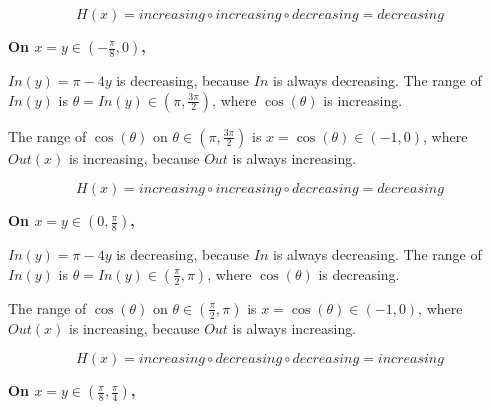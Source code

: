 \documentclass{ximera}
\begin{document}
\[
H(x) = increasing \circ increasing \circ decreasing = decreasing
\]











\textbf{\textcolor{purple!80!black}{On $x = y \in \left( -\frac{\pi}{8}, 0 \right)$, }}



$In(y) = \pi - 4y$ is decreasing, because $In$ is always decreasing.  The range of $In(y)$ is $\theta = In(y) \in \left(\pi, \frac{3\pi}{2} \right)$, where $\cos(\theta)$ is increasing. 



The range of $\cos(\theta)$ on $\theta \in \left(\pi, \frac{3\pi}{2} \right)$ is $x = \cos(\theta) \in (-1, 0)$, where $Out(x)$ is increasing, because $Out$ is always increasing. 


\[
H(x) = increasing \circ increasing \circ decreasing = decreasing
\]

















\textbf{\textcolor{purple!80!black}{On $x = y \in \left( 0, \frac{\pi}{8} \right)$, }}



$In(y) = \pi - 4y$ is decreasing, because $In$ is always decreasing.  The range of $In(y)$ is $\theta = In(y) \in \left(\frac{\pi}{2}, \pi \right)$, where $\cos(\theta)$ is decreasing. 



The range of $\cos(\theta)$ on $\theta \in \left(\frac{\pi}{2}, \pi \right)$ is $x = \cos(\theta) \in (-1, 0)$, where $Out(x)$ is increasing, because $Out$ is always increasing. 


\[
H(x) = increasing \circ decreasing \circ decreasing = increasing
\]















\textbf{\textcolor{purple!80!black}{On $x = y \in \left( \frac{\pi}{8}, \frac{\pi}{4} \right)$, }}
\end{document}
